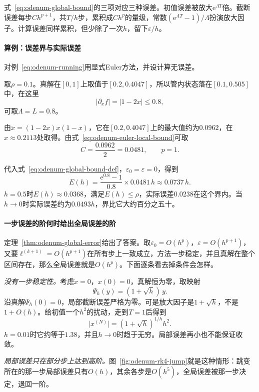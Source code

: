 式~\eqref{eq:odenum-global-bound}的三项对应三种误差。初值误差被放大$\mathrm{e}^{\Lambda T}$倍。截断误差每步$Ch^{p+1}$，共$T/h$步，累积成$Ch^{p}$的量级，常数$(\mathrm{e}^{\Lambda T}-1)/\Lambda$扮演放大因子。计算误差同样累积，但少除了一次$h$，留下$\varepsilon/h$。

\paragraph{算例：误差界与实际误差}
\begin{example}[Euler方法的误差界]
 \label{ex:odenum-euler-bound}
 对例~\eqref{eq:odenum-running}用显式Euler方法，并设计算无误差。

 取$\rho=0.1$。真解在$[0,1]$上取值于$[0.2,0.4047]$，所以管内状态落在$[0.1,0.505]$中，在这里
 \[
  \lvert\partial_xf\rvert=\lvert1-2x\rvert\leq0.8,
 \]
 可取$\Lambda=L=0.8$。

 由$\ddot{x}=(1-2x)x(1-x)$，它在$[0.2,0.4047]$上的最大值约为$0.0962$，在$x\approx0.2113$处取得。由式~\eqref{eq:odenum-euler-local-bound}可取
 \[
  C=\frac{0.0962}{2}=0.0481,\qquad p=1.
 \]

 代入式~\eqref{eq:odenum-global-bound-def}，$\varepsilon_0=\varepsilon=0$，得到
 \[
  E(h)=\frac{\mathrm{e}^{0.8}-1}{0.8}\times0.0481\,h\approx0.0737\,h.
 \]
 $h=0.5$时$E(h)\approx0.0368$，满足$E(h)\leq\rho$，实际误差$0.0238$在这个界内。当$h\to0$时实际误差约为$0.0493h$，界比它大约百分之五十。
\end{example}

\paragraph{一步误差的阶何时给出全局误差的阶}
定理~\ref{thm:odenum-global-error}给出了答案。取$\varepsilon_0=O(h^{p})$，$\varepsilon=O(h^{p+1})$，又要$\bm{\ell}^{(k+1)}=O(h^{p+1})$在所有步上一致成立，方法一步稳定，并且真解在整个区间存在，那么全局误差就是$O(h^{p})$。下面逐条看去掉条件会怎样。

\emph{没有一步稳定性。}考虑$\dot{x}=0$，$x(0)=0$，真解恒为零，取映射
\[
 \Psi_h(y)=(1+\sqrt{h})\,y.
\]
沿真解$\Psi_h(0)=0$，局部截断误差严格为零。可是放大因子是$1+\sqrt{h}$，不是$1+O(h)$。给初值一个$h^2$的扰动，走到$T=1$后得到
\[
 \lvert x^{(N)}\rvert=(1+\sqrt{h})^{1/h}h^{2}.
\]
$h=0.01$时它约等于$1.38$，并且$h\to0$时趋于无穷。局部误差再小也不能保证收敛。

\emph{局部误差只在部分步上达到高阶。}图~\ref{fig:odenum-rk4-jump}就是这种情形：跳变所在的那一步局部误差只有$O(h)$，其余各步是$O(h^{5})$，全局误差被那一步决定，退回一阶。

